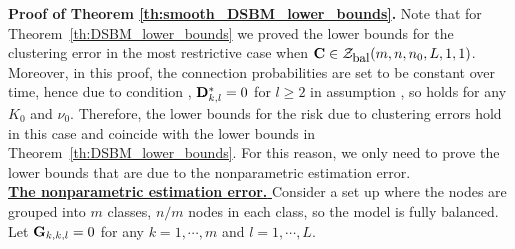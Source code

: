   


\noindent
{\bf Proof of Theorem \ref{th:smooth_DSBM_lower_bounds}. }
Note that for Theorem~\ref{th:DSBM_lower_bounds} we proved the lower bounds for the clustering error in the most restrictive case when 
$\mathbf{C} \in  {\cal{Z}}_{\mbox{\small bal}} (m,n,n_0,L,1,1)$. Moreover, in this proof, the connection probabilities are set to be constant over time,  hence
due to condition  , $\mathbf{D}^*_{k,l}=0$ for $l \geq 2$ in assumption , so  holds
for any $K_0$ and $\nu_0$. Therefore, the lower bounds for the risk due to clustering errors hold in this case and coincide with the lower bounds in 
Theorem~\ref{th:DSBM_lower_bounds}. For this reason, we only need to prove the lower bounds that are due to the nonparametric estimation error.
\\



 
\underline{\bf The nonparametric estimation error. } 
Consider a set up where the nodes are grouped into $m$ classes,
$n/m$ nodes in each class, so the model is fully balanced.
Let $\mathbf{G}_{k,k,l} =0$ for any $k=1, \cdots, m$ and $l=1, \cdots, L$.



